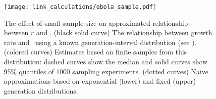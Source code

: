 \begin{figure}[htbp] \centering
	\texttt{[image: link\_calculations/ebola\_sample.pdf]}
\caption{
%
The effect of small sample size on approximated relationship between $r$ and \RR.
(black solid curve) The relationship between growth rate and \RR~using a known generation-interval distribution (see ).
(colored curves) Estimates based on finite samples from this distribution: dashed curves show the median and solid curves show 95\% quantiles of 1000 sampling experiments.
(dotted curves) Naive approximations based on exponential (lower) and fixed (upper) generation distributions.
%
}
	\label{fig:ebolaSample}
\end{figure}





